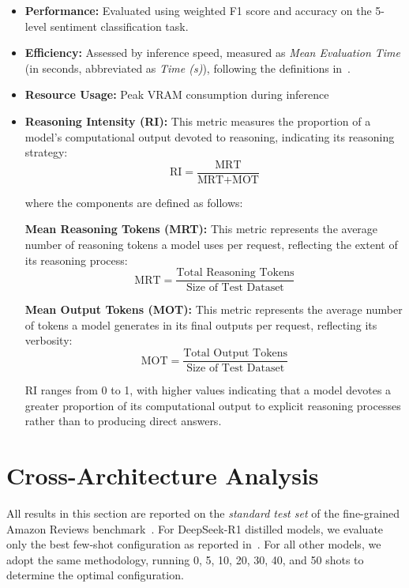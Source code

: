 \documentclass[conference]{IEEEtran}
\newcommand{\DeepSeekR}{DeepSeek-R1}
\begin{document}
\begin{itemize}[leftmargin=*,nosep]
    \item \textbf{Performance:} Evaluated using weighted F1 score and accuracy on the 5-level sentiment classification task.  
    \item \textbf{Efficiency:} Assessed by inference speed, measured as \emph{Mean Evaluation Time} (in seconds, abbreviated as \emph{Time (s)}), following the definitions in~\cite{huang2025explainable}.  
    \item \textbf{Resource Usage:} Peak VRAM consumption during inference  
    \item \textbf{Reasoning Intensity (RI):} This metric measures the proportion of a model's computational output devoted to reasoning, indicating its reasoning strategy:
\begin{equation}
\text{RI} = \frac{\text{MRT}}{\text{MRT} + \text{MOT}} \label{eq:ri}
\end{equation}

where the components are defined as follows:

\textbf{Mean Reasoning Tokens (MRT):} This metric represents the average number of reasoning tokens a model uses per request, reflecting the extent of its reasoning process:
\begin{equation}
\text{MRT} = \frac{\text{Total Reasoning Tokens}}{\text{Size of Test Dataset}}
 \label{eq:mrt}
 \end{equation}

\textbf{Mean Output Tokens (MOT):} This metric represents the average number of tokens a model generates in its final outputs per request, reflecting its verbosity:
\begin{equation}
\text{MOT} = \frac{\text{Total Output Tokens}}{\text{Size of Test Dataset}} \label{eq:mot}
\end{equation}

RI ranges from 0 to 1, with higher values indicating that a model devotes a greater proportion of its computational output to explicit reasoning processes rather than to producing direct answers.

\end{itemize}

\section{Cross-Architecture Analysis}
\label{sec:cross-arch}

All results in this section are reported on the \emph{standard test set} of the fine-grained Amazon Reviews benchmark~\cite{huang2025explainable}. For \DeepSeekR{} distilled models, we evaluate only the best few-shot configuration as reported in~\cite{huang2025explainable}. 
For all other models, we adopt the same methodology, running 0, 5, 10, 20, 30, 40, and 50 shots to determine the optimal configuration. 
\end{document}
